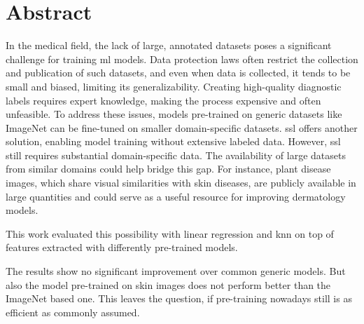 \chapter*{Abstract}

In the medical field, the lack of large, annotated datasets poses a significant challenge for training \gls{ml} models. Data protection laws often restrict the collection and publication of such datasets, and even when data is collected, it tends to be small and biased, limiting its generalizability. Creating high-quality diagnostic labels requires expert knowledge, making the process expensive and often unfeasible. To address these issues, models pre-trained on generic datasets like ImageNet can be fine-tuned on smaller domain-specific datasets. \gls{ssl} offers another solution, enabling model training without extensive labeled data. However, \gls{ssl} still requires substantial domain-specific data. The availability of large datasets from similar domains could help bridge this gap. For instance, plant disease images, which share visual similarities with skin diseases, are publicly available in large quantities and could serve as a useful resource for improving dermatology models.

This work evaluated this possibility with linear regression and \gls{knn} on top of features extracted with differently pre-trained models.

The results show no significant improvement over common generic models. But also the model pre-trained on skin images does not perform better than the ImageNet based one. This leaves the question, if pre-training nowadays still is as efficient as commonly assumed.



